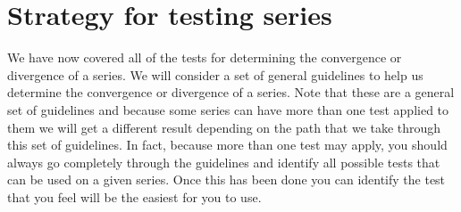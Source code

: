 \section{Strategy for testing series}\label{sec:series_techniques}

We have now covered all of the tests for determining the convergence or divergence of a series. We will consider a set of general guidelines to help us determine the convergence or divergence of a series. Note that these are a general set of guidelines and because some series can have more than one test applied to them we will get a different result depending on the path that we take through this set of guidelines. In fact, because more than one test may apply, you should always go completely through the guidelines and identify all possible tests that can be used on a given series. Once this has been done you can identify the test that you feel will be the easiest for you to use.

